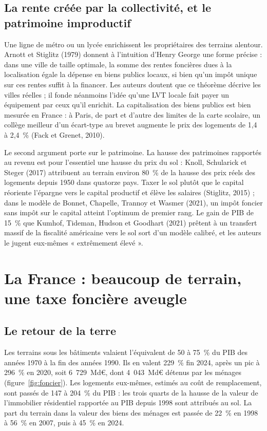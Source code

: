\documentclass[11pt,a4paper]{article}
\begin{document}
\subsection{La rente créée par la collectivité, et le patrimoine improductif}

Une ligne de métro ou un lycée enrichissent les propriétaires des terrains alentour. Arnott et
Stiglitz (1979) donnent à l'intuition d'Henry George une forme précise : dans une ville de taille optimale, la somme des rentes foncières dues à la
localisation égale la dépense en biens publics locaux, si bien qu'un impôt unique sur ces rentes
suffit à la financer. Les auteurs doutent que ce théorème décrive les villes réelles ; il fonde
néanmoins l'idée qu'une LVT locale fait payer un équipement par ceux qu'il enrichit. La
capitalisation des biens publics est bien mesurée en France : à Paris, de part et d'autre des
limites de la carte scolaire, un collège meilleur d'un écart-type au brevet augmente le prix des
logements de 1,4 à 2,4~\% (Fack et Grenet, 2010).

Le second argument porte sur le patrimoine. La hausse des patrimoines rapportés au revenu est pour
l'essentiel une hausse du prix du sol : Knoll, Schularick et Steger (2017) attribuent au terrain
environ 80~\% de la hausse des prix réels des logements depuis 1950 dans quatorze pays.  Taxer le sol plutôt que le
capital réoriente l'épargne vers le capital productif et élève les salaires (Stiglitz, 2015) ;
dans le modèle de Bonnet, Chapelle, Trannoy et Wasmer (2021), un impôt foncier sans impôt sur le
capital atteint l'optimum de premier rang. Le gain de PIB de 15~\% que
Kumhof, Tideman, Hudson et Goodhart (2021) prêtent à un transfert massif de la fiscalité américaine
vers le sol sort d'un modèle calibré, et les auteurs le jugent eux-mêmes « extrêmement élevé ».

\section{La France : beaucoup de terrain, une taxe foncière aveugle}\label{sec:france}

\subsection{Le retour de la terre}

Les terrains sous les bâtiments valaient l'équivalent de 50 à 75~\% du PIB des années 1970 à la fin
des années 1990. Ils en valent 229~\% fin 2024, après un pic à 296~\% en 2020, soit 6~729~Md€, dont
4~043~Md€ détenus par les ménages (figure~\ref{fig:foncier}). Les logements eux-mêmes, estimés au
coût de remplacement, sont passés de 147 à 204~\% du PIB : les trois quarts de la hausse de la
valeur de l'immobilier résidentiel rapportée au PIB depuis 1998 sont attribués au sol. La part du
terrain dans la valeur des biens des ménages est passée de 22~\% en 1998 à 56~\% en 2007, puis à
45~\% en 2024.
\end{document}
